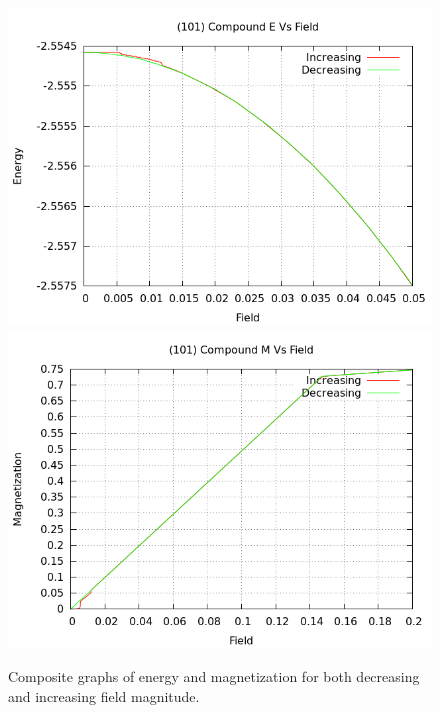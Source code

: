 \documentclass{article}
\begin{document}
\begin{figure}[ht]
\centering
\includegraphics[scale=0.6]{HVariedData/compoundEM/101Ecompound.png}
\includegraphics[scale=0.6]{HVariedData/compoundEM/101Mcompound.png}
\caption{Composite graphs of energy and magnetization for both decreasing and increasing field magnitude.}
\end{figure}
\clearpage

\pagebreak
\end{document}
